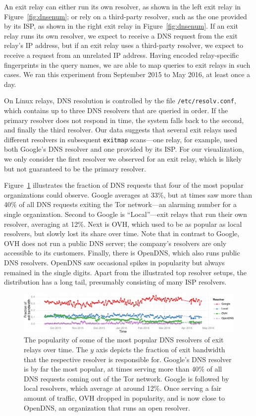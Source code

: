 An exit relay can either run its own resolver, as shown in the left exit relay in
Figure~\ref{fig:dnsenum}; or rely on a third-party resolver, such as the one
provided by its ISP, as shown in the right exit relay in Figure~\ref{fig:dnsenum}.  If
an exit relay runs its own resolver, we expect to receive a DNS request from
the exit relay's IP address, but if an exit relay uses a third-party resolver,
we expect to receive a request from an unrelated IP address.  Having encoded
relay-specific fingerprints in the query names, we are able to map queries to
exit relays in such cases.  We ran this experiment from September 2015 to May
2016, at least once a day.

On Linux relays, DNS resolution is controlled by the file
\texttt{/etc/resolv.conf}, which contains up to three DNS resolvers that are
queried in order.  If the primary resolver does not respond in time, the system
falls back to the second, and finally the third resolver.  Our data suggests
that several exit relays used different resolvers in subsequent {\tt exitmap}
scans---one relay, for example, used both Google's DNS resolver and one provided
by its ISP.  For our visualization, we only consider the first resolver we
observed for an exit relay, which is likely but not guaranteed to be the primary
resolver.

Figure~\ref{fig:exit-resolvers} illustrates the fraction of DNS requests that
four of the most popular organizations could observe.  Google averages at 33\%,
but at times saw more than 40\% of all DNS requests exiting the Tor network---an
alarming number for a single organization.  Second to Google is ``Local''---exit
relays that run their own resolver, averaging at 12\%.  Next is OVH, which used
to be as popular as local resolvers, but slowly lost its share over time.  Note
that in contrast to Google, OVH does not run a public DNS server; the company's
resolvers are only accessible to its customers.  Finally, there is OpenDNS,
which also runs public DNS resolvers.  OpenDNS saw occasional spikes in
popularity but always remained in the single digits.  Apart from the illustrated
top resolver setups, the distribution has a long tail, presumably consisting of
many ISP resolvers.

\begin{figure}[t]
	\centering
	\includegraphics[width=\linewidth]{figures/asn-bw-frac.pdf}
	\caption{The popularity of some of the most popular DNS resolvers of exit
		relays over time.  The $y$ axis depicts the fraction of exit bandwidth
		that the respective resolver is responsible for.  Google's DNS resolver
		is by far the most popular, at times serving more than 40\% of all DNS
		requests coming out of the Tor network.  Google is followed by local
		resolvers, which average at around 12\%.  Once serving a fair amount of
		traffic, OVH dropped in popularity, and is now close to OpenDNS, an
		organization that runs an open resolver.}
	\label{fig:exit-resolvers}
\end{figure}

